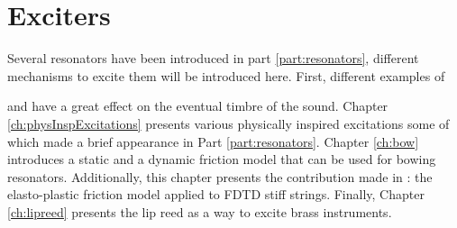 \chapter*{Exciters}
Several resonators have been introduced in part \ref{part:resonators}, different mechanisms to excite them will be introduced here. First, different examples of 

and have a great effect on the eventual timbre of the sound. 
Chapter \ref{ch:physInspExcitations} presents various physically inspired excitations some of which made a brief appearance in Part \ref{part:resonators}. Chapter \ref{ch:bow} introduces a static and a dynamic friction model that can be used for bowing resonators. Additionally, this chapter presents the contribution made in \citeP[C]: the elasto-plastic friction model applied to FDTD stiff strings. Finally, Chapter \ref{ch:lipreed} presents the lip reed as a way to excite brass instruments. 
